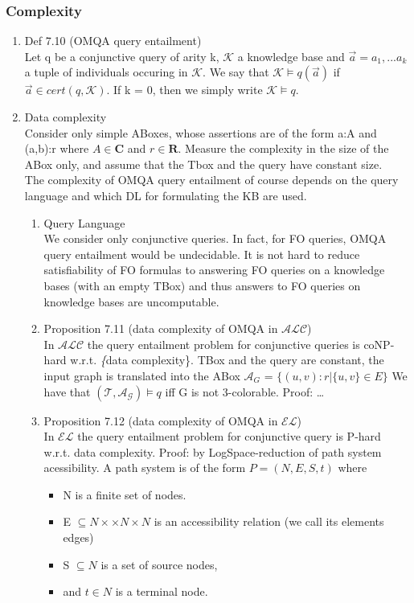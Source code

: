 \documentclass[11pt]{article}
\begin{document}
\subsubsection{Complexity}
\label{sec-1-2-2}
\begin{enumerate}
\item Def 7.10 (OMQA query entailment) \\
\label{sec-1-2-2-1}
Let q be a conjunctive query of arity k, $\mathcal{K}$ a knowledge
base and $\overset{\to}{a} = a_{1}, ... a_{k}$ a tuple of individuals
occuring in $\mathcal{K}$.
We say that $\mathcal{K} \models q(\overset{\to}{a})$ if 
$\overset{\to}{a} \in cert(q,\mathcal{K})$. If k = 0, then we 
simply write $\mathcal{K} \models q$.
\item Data complexity \\
\label{sec-1-2-2-2}
Consider only simple ABoxes, whose assertions are of the form
a:A and (a,b):r where $A\in \mathbf{C}$ and $r \in \mathbf{R}$.
Measure the complexity in the size of the ABox only, and
assume that the Tbox and the query have constant size.\\
     The complexity of OMQA query entailment of course depends on the 
query language and which DL for formulating the KB are used.
\begin{enumerate}
\item Query Language \\
\label{sec-1-2-2-2-1}
We consider only conjunctive queries.
In fact, for FO queries, OMQA query entailment would be 
undecidable. It is not hard to reduce satisfiability of FO formulas
to answering FO queries on a knowledge bases (with an empty TBox)
and thus answers to FO queries on knowledge bases are uncomputable.
\item Proposition 7.11 (data complexity of OMQA in $\mathcal{A}\mathcal{L}\mathcal{C}$) \\
\label{sec-1-2-2-2-2}
In $\mathcal{A}\mathcal{L}\mathcal{C}$ the query entailment
problem for conjunctive queries is coNP-hard w.r.t. \textit\{data 
complexity\}. TBox and the query are constant, the input graph
is translated into the ABox $\mathcal{A}_{G}$ = $\{(u,v):r | \{u,v\}\in E\}$
We have that $(\mathcal{T},\mathcal{A_{G}}) \models q$ iff G is not 3-colorable.
Proof: \ldots{}
\item Proposition 7.12  (data complexity of OMQA in $\mathcal{E}\mathcal{L}$) \\
\label{sec-1-2-2-2-3}
In $\mathcal{E}\mathcal{L}$ the query entailment problem for 
conjunctive query is P-hard w.r.t. data complexity.      
Proof: by LogSpace-reduction of path system acessibility.
A path system is of the form $P= (N,E,S,t)$ where
\begin{itemize}
\item N is a finite set of nodes. 
\item E $\subseteq N \times \times N \times N$ is an 
accessibility relation (we call its elements edges)
\item S $\subseteq N$ is a set of source nodes,
\item and $t \in N$ is a terminal node.
\end{itemize}


\end{enumerate}
\end{enumerate}
\end{document}
